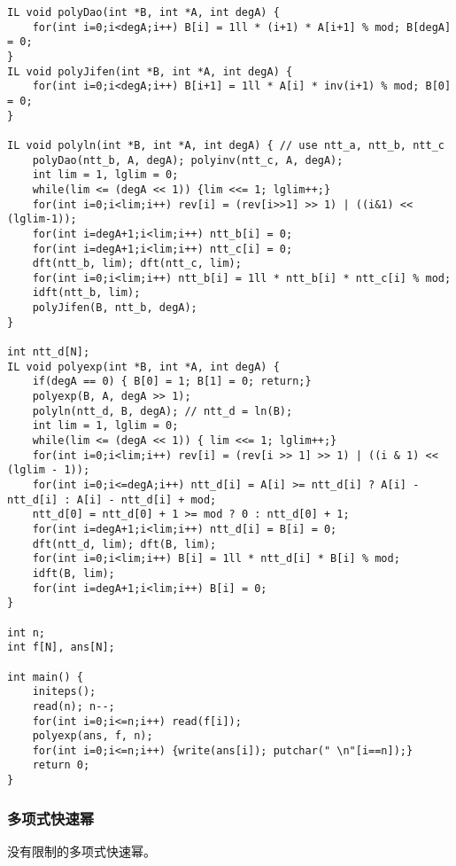 \documentclass[UTF8]{ctexart}
\begin{document}
\begin{framed}
\begin{lstlisting}
IL void polyDao(int *B, int *A, int degA) {
    for(int i=0;i<degA;i++) B[i] = 1ll * (i+1) * A[i+1] % mod; B[degA] = 0;
}
IL void polyJifen(int *B, int *A, int degA) {
    for(int i=0;i<degA;i++) B[i+1] = 1ll * A[i] * inv(i+1) % mod; B[0] = 0;
}

IL void polyln(int *B, int *A, int degA) { // use ntt_a, ntt_b, ntt_c
    polyDao(ntt_b, A, degA); polyinv(ntt_c, A, degA);
    int lim = 1, lglim = 0;
    while(lim <= (degA << 1)) {lim <<= 1; lglim++;}
    for(int i=0;i<lim;i++) rev[i] = (rev[i>>1] >> 1) | ((i&1) << (lglim-1));
    for(int i=degA+1;i<lim;i++) ntt_b[i] = 0;
    for(int i=degA+1;i<lim;i++) ntt_c[i] = 0;
    dft(ntt_b, lim); dft(ntt_c, lim);
    for(int i=0;i<lim;i++) ntt_b[i] = 1ll * ntt_b[i] * ntt_c[i] % mod;
    idft(ntt_b, lim);
    polyJifen(B, ntt_b, degA);
}

int ntt_d[N];
IL void polyexp(int *B, int *A, int degA) {
    if(degA == 0) { B[0] = 1; B[1] = 0; return;}
    polyexp(B, A, degA >> 1);
    polyln(ntt_d, B, degA); // ntt_d = ln(B);
    int lim = 1, lglim = 0;
    while(lim <= (degA << 1)) { lim <<= 1; lglim++;}
    for(int i=0;i<lim;i++) rev[i] = (rev[i >> 1] >> 1) | ((i & 1) << (lglim - 1));
    for(int i=0;i<=degA;i++) ntt_d[i] = A[i] >= ntt_d[i] ? A[i] - ntt_d[i] : A[i] - ntt_d[i] + mod;
    ntt_d[0] = ntt_d[0] + 1 >= mod ? 0 : ntt_d[0] + 1;
    for(int i=degA+1;i<lim;i++) ntt_d[i] = B[i] = 0;
    dft(ntt_d, lim); dft(B, lim);
    for(int i=0;i<lim;i++) B[i] = 1ll * ntt_d[i] * B[i] % mod;
    idft(B, lim);
    for(int i=degA+1;i<lim;i++) B[i] = 0;
}

int n;
int f[N], ans[N];

int main() {
    initeps();
    read(n); n--;
    for(int i=0;i<=n;i++) read(f[i]);
    polyexp(ans, f, n);
    for(int i=0;i<=n;i++) {write(ans[i]); putchar(" \n"[i==n]);}
    return 0;
}
\end{lstlisting}
\end{framed}

\subsubsection{多项式快速幂}
没有限制的多项式快速幂。
\end{document}

